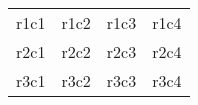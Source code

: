 \begin{tabular}{cccc}
  r1c1 & r1c2 & r1c3 & r1c4\\
  r2c1 & r2c2 & r2c3 & r2c4\\
  r3c1 & r3c2 & r3c3 & r3c4\\
\end{tabular}

